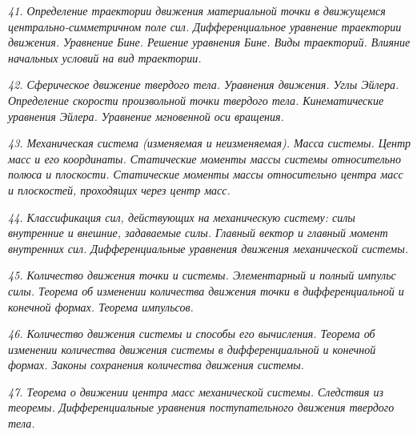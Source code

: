 \newpage %

\emph{41. Определение траектории движения материальной точки в движущемся
центрально-симметричном поле сил. Дифференциальное уравнение траектории
движения. Уравнение Бине. Решение уравнения Бине. Виды траекторий. Влияние
начальных условий на вид траектории.}

\newpage %

\emph{42. Сферическое движение твердого тела. Уравнения движения. Углы Эйлера.
Определение скорости произвольной точки твердого тела. Кинематические
уравнения Эйлера. Уравнение мгновенной оси вращения.}

\newpage %

\emph{43. Механическая система (изменяемая и неизменяемая). Масса системы. Центр
масс и его координаты. Статические моменты массы системы относительно
полюса и плоскости. Статические моменты массы относительно центра масс и
плоскостей, проходящих через центр масс.}

\newpage %

\emph{44. Классификация сил, действующих на механическую систему: силы внутренние
и внешние, задаваемые силы. Главный вектор и главный момент внутренних сил.
Дифференциальные уравнения движения механической системы.}

\newpage %

\emph{45. Количество движения точки и системы. Элементарный и полный импульс
силы. Теорема об изменении количества движения точки в дифференциальной и
конечной формах. Теорема импульсов.}

\newpage %

\emph{46. Количество движения системы и способы его вычисления. Теорема об
изменении количества движения системы в дифференциальной и конечной
формах. Законы сохранения количества движения системы.}

\newpage %

\emph{47. Теорема о движении центра масс механической системы. Следствия из
теоремы. Дифференциальные уравнения поступательного движения твердого
тела.}


